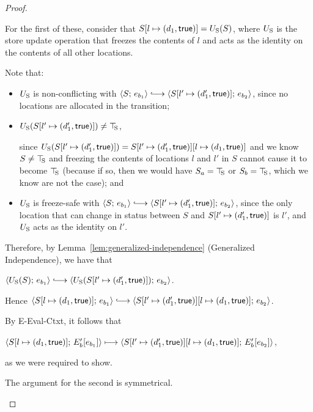 \begin{proof}
\begin{enumerate}
\begin{enumerate}
\begin{itemize}
        For the first of these, consider that
        $S[l \mapsto (d_1, \textsf{true})] = U_{\mathrm{S}}(S)$, where $U_{\mathrm{S}}$ is the
        store update operation that freezes the contents of $l$
        and acts as the identity on the contents of all other
        locations.

        Note that:
        \begin{itemize}
        \item $U_{\mathrm{S}}$ is non-conflicting with $\config{S}{e_{b_1}}
          \parstepsto
          \config{\extS{S}{l'}{d'_1}{\frozentrue}}{e_{b_2}}$, since
          no locations are allocated in the transition;
        \item $U_{\mathrm{S}}(S[l' \mapsto (d'_1, \textsf{true})]) \neq \top\hspace{-0.85mm}_{\mathrm{S}}$,

          since $U_{\mathrm{S}}(S[l' \mapsto (d'_1, \textsf{true})]) =
          S[l' \mapsto (d'_1, \textsf{true})][l \mapsto (d_1, \textsf{true})]$
          and we know $S \neq \top\hspace{-0.85mm}_{\mathrm{S}}$ and freezing the contents of
          locations $l$ and $l'$ in $S$ cannot cause it to become
          $\top\hspace{-0.85mm}_{\mathrm{S}}$ (because if so, then we would have $S_a = \top\hspace{-0.85mm}_{\mathrm{S}}$
          or $S_b = \top\hspace{-0.85mm}_{\mathrm{S}}$, which we know are not the case); and
        \item $U_{\mathrm{S}}$ is freeze-safe with $\config{S}{e_{b_1}}
          \parstepsto
          \config{\extS{S}{l'}{d'_1}{\frozentrue}}{e_{b_2}}$, since
          the only location that can change in status between $S$
          and $S[l' \mapsto (d'_1, \textsf{true})]$ is $l'$, and $U_{\mathrm{S}}$
          acts as the identity on $l'$.
        \end{itemize}
        Therefore, by Lemma~\ref{lem:generalized-independence}
        (Generalized Independence), we have that

        $\config{\Ustore(S)}{e_{b_1}} \parstepsto
        \config{\Ustore(\extS{S}{l'}{d'_1}{\frozentrue})}{e_{b_2}}$.

        Hence $\config{\extS{S}{l}{d_1}{\frozentrue}}{e_{b_1}}
        \parstepsto
        \config{\extS{\extS{S}{l'}{d'_1}{\frozentrue}}{l}{d_1}{\frozentrue}}{e_{b_2}}$.

        By {\sc E-Eval-Ctxt}, it follows that

        $\langle S[l \mapsto (d_1, \textsf{true})];\, E'_b\hspace{-0.5mm}\left[e_{b_1}\right] \rangle
        \longmapsto
        \langle S[l' \mapsto (d'_1, \textsf{true})][l \mapsto (d_1, \textsf{true})];\, E'_b\hspace{-0.5mm}\left[e_{b_2}\right] \rangle$,
        
        as we were required to show.

        The argument for the second is symmetrical.


\end{itemize}
\end{enumerate}
\end{enumerate}
\end{proof}
